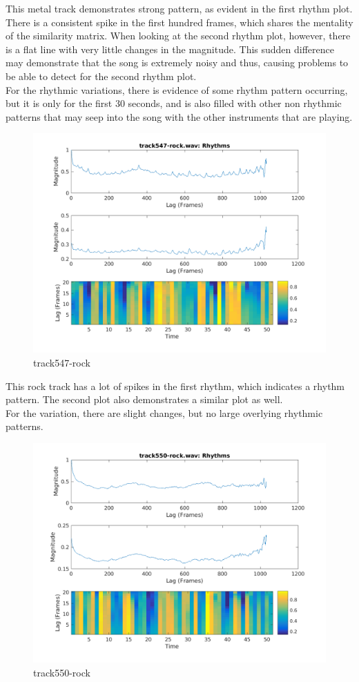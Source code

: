 \documentclass[11pt, a4paper]{article}
\begin{document}
This metal track demonstrates strong pattern, as evident in the first rhythm plot. There is a consistent spike in the first hundred frames, which shares the mentality of the similarity matrix. When looking at the second rhythm plot, however, there is a flat line with very little changes in the magnitude. This sudden difference may demonstrate that the song is extremely noisy and thus, causing problems to be able to detect for the second rhythm plot. \\

For the rhythmic variations, there is evidence of some rhythm pattern occurring, but it is only for the first 30 seconds, and is also filled with other non rhythmic patterns that may seep into the song with the other instruments that are playing. 

\begin{figure}[H]
    \centering
    \includegraphics[width=.8\textwidth]{track547-rock-Rhythm.png}
    \caption{track547-rock}
\end{figure}

This rock track has a lot of spikes in the first rhythm, which indicates a rhythm pattern. The second plot also demonstrates a similar plot as well. \\

For the variation, there are slight changes, but no large overlying rhythmic patterns.  

\begin{figure}[H]
    \centering
    \includegraphics[width=.8\textwidth]{track550-rock-Rhythm.png}
    \caption{track550-rock}
\end{figure}
\end{document}
